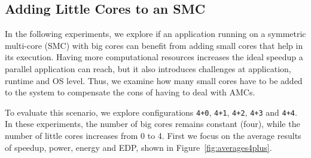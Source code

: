 


\subsection{Adding Little Cores to an SMC}

In the following experiments, we explore if an application running on a symmetric multi-core (SMC) with big cores can benefit from adding small cores that help in its execution. Having more computational resources increases the ideal speedup a parallel application can reach, but it also introduces challenges at application, runtime and OS level. 
Thus, we examine how many small cores have to be added to the system to compensate the cons of having to deal with AMCs.

To evaluate this scenario, we explore configurations \texttt{4+0}, \texttt{4+1}, \texttt{4+2}, \texttt{4+3} and \texttt{4+4}. In these experiments, the number of big cores remains constant (four), while the number of little cores increases from 0 to 4. First we focus on the average results of speedup, power, energy and EDP, shown in Figure~\ref{fig:averages4plus}.

